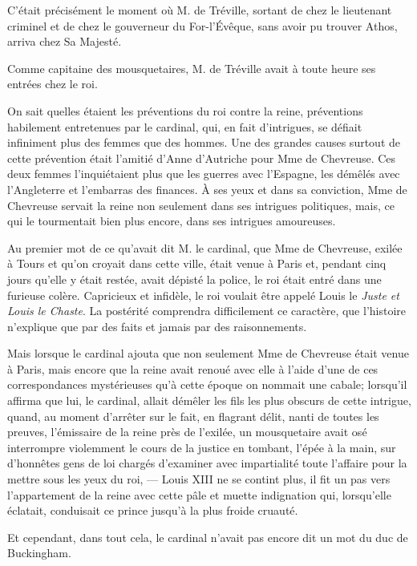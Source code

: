 C'était précisément le moment où M. de Tréville, sortant de chez le lieutenant criminel et de chez le gouverneur du For-l'Évêque, sans avoir pu trouver Athos, arriva chez Sa Majesté. 

Comme capitaine des mousquetaires, M. de Tréville avait à toute heure ses entrées chez le roi. 

On sait quelles étaient les préventions du roi contre la reine, préventions habilement entretenues par le cardinal, qui, en fait d'intrigues, se défiait infiniment plus des femmes que des hommes. Une des grandes causes surtout de cette prévention était l'amitié d'Anne d'Autriche pour Mme de Chevreuse. Ces deux femmes l'inquiétaient plus que les guerres avec l'Espagne, les démêlés avec l'Angleterre et l'embarras des finances. À ses yeux et dans sa conviction, Mme de Chevreuse servait la reine non seulement dans ses intrigues politiques, mais, ce qui le tourmentait bien plus encore, dans ses intrigues amoureuses. 

Au premier mot de ce qu'avait dit M. le cardinal, que Mme de Chevreuse, exilée à Tours et qu'on croyait dans cette ville, était venue à Paris et, pendant cinq jours qu'elle y était restée, avait dépisté la police, le roi était entré dans une furieuse colère. Capricieux et infidèle, le roi voulait être appelé Louis le \textit{Juste et Louis le Chaste}. La postérité comprendra difficilement ce caractère, que l'histoire n'explique que par des faits et jamais par des raisonnements. 

Mais lorsque le cardinal ajouta que non seulement Mme de Chevreuse était venue à Paris, mais encore que la reine avait renoué avec elle à l'aide d'une de ces correspondances mystérieuses qu'à cette époque on nommait une cabale; lorsqu'il affirma que lui, le cardinal, allait démêler les fils les plus obscurs de cette intrigue, quand, au moment d'arrêter sur le fait, en flagrant délit, nanti de toutes les preuves, l'émissaire de la reine près de l'exilée, un mousquetaire avait osé interrompre violemment le cours de la justice en tombant, l'épée à la main, sur d'honnêtes gens de loi chargés d'examiner avec impartialité toute l'affaire pour la mettre sous les yeux du roi, --- Louis XIII ne se contint plus, il fit un pas vers l'appartement de la reine avec cette pâle et muette indignation qui, lorsqu'elle éclatait, conduisait ce prince jusqu'à la plus froide cruauté. 

Et cependant, dans tout cela, le cardinal n'avait pas encore dit un mot du duc de Buckingham. 


